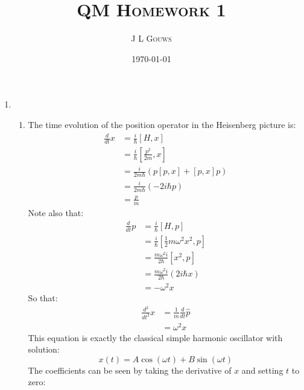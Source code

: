 \documentclass[12pt,a4]{article}
\title{
\textsc{QM Homework 1}
}
\author{\textsc{J L Gouws}
}
\date{\today
\\[1cm]}
\begin{document}
\thispagestyle{empty}

\maketitle

\begin{enumerate}
  \item
    \begin{enumerate}
      \item 
        The time evolution of the position operator in the Heisenberg picture is:
        \begin{align*}
          \frac{d}{d t}      x &= \frac{i}{\hbar}\left[H, x\right]\\
                               &= \frac{i}{\hbar}\left[\frac{ p^2}{2m}, x\right]\\
                               &= \frac{i}{2m\hbar}\left( p\left[ p, x\right] + \left[ p, x\right]  p\right)\\
                               &= \frac{i}{2m\hbar}\left(-2 i \hbar p\right)\\
                               &= \frac{ p}{m}
        \end{align*}
        Note also that:
        \begin{align*}
          \frac{d}{d t}      p &= \frac{i}{\hbar}\left[H, p\right]\\
                               &= \frac{i}{\hbar}\left[\frac{1}{2} m\omega^2 x^2, p\right]\\
                               &= \frac{m\omega^2 i}{2\hbar}\left[ x^2, p\right]\\
                               &= \frac{m\omega^2 i}{2\hbar}\left( 2 i \hbar x \right)\\
                               &= -\omega^2 x
        \end{align*}
        So that:
        \begin{align*}
          \frac{d^2}{d t^2} x &= \frac{1}{m}\frac{d}{dt}\hat p\\
                                   &= \omega^2 x
        \end{align*}
        This equation is exactly the classical simple harmonic oscillator with solution:
        \begin{equation*}
          x(t) = A \cos (\omega t) + B \sin (\omega t)
        \end{equation*}
        The coefficients can be seen by taking the derivative of $x$ and setting $t$ to zero:

\end{enumerate}
\end{enumerate}
\end{document}
